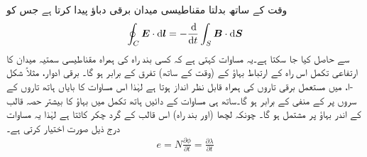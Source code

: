 وقت کے ساتھ بدلتا مقناطیسی میدان برقی دباؤ پیدا کرتا ہے جس کو 
\begin{align*}
\oint_C\kvec{E}\cdot\dif \kvec{l}=-\frac{\dif}{\dif t}\int_S\kvec{B}\cdot\dif \kvec{S}
\end{align*}
 سے حاصل کیا جا سکتا ہے۔یہ مساوات کہتی ہے کہ کسی بند راہ کی ہمراہ مقناطیسی سمتیہ میدان  کا ارتفاعی تکمل اس راہ کے ارتباط بہاؤ کے  (وقت کے ساتھ) تفرق کے برابر ہو گا۔ برقی ادوار، مثلاً شکل -ا،  میں مستعمل برقی تاروں  کی ہمراہ  قابل نظر انداز ہوتا ہے لہٰذا اس مساوات کا بایاں ہاتھ تاروں کے سروں پر    کے منفی کے برابر ہو گا۔ساتھ ہی مساوات کے دائیں ہاتھ تکمل میں بہاؤ کا بیشتر حصہ قالب کے اندر بہاؤ  پر مشتمل ہو گا۔ چونکہ لچھا (اور بند راہ)  اس قالب کے گرد  چکر کاٹتا ہے لہٰذا  یہ مساوات درج ذیل صورت اختیار کرتی ہے۔ 
\begin{align}\label{مساوات_مقناطیسی_دور_فیراڈے_قانون}
e=N \frac{\partial \phi}{\partial t} =\frac{\partial \lambda}{\partial t}
\end{align}

